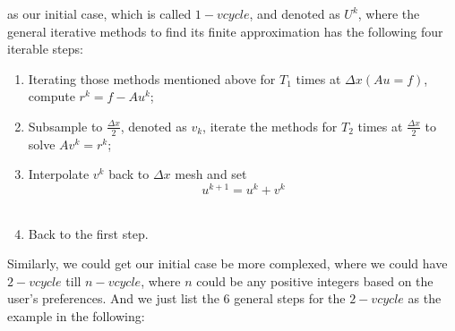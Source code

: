 \documentclass [a4paper, 12pt]{article}
\begin{document}
as our initial case, which is called $1-vcycle$, and denoted as $U^k$, where the general iterative methods to find its finite approximation has the following four iterable steps: 
\begin {enumerate}
\item Iterating those methods mentioned above for $T_1$ times at $\Delta x (Au=f)$, compute $r^k=f-Au^k$; \\
\item Subsample to $\frac {\Delta x}
                                                                   {2}$,
denoted as $v_k$, iterate the methods for $T_2$ times at $\frac {\Delta x}
                                                                                                              {2}$
to solve $Av^k=r^k$; \\
\item Interpolate $v^k$ back to $\Delta x$ mesh and set \\
\begin {equation}
     u^{k+1}=u^k+v^k
\end {equation} \\
\item Back to the first step. 
\end {enumerate}
Similarly, we could get our initial case be more complexed, where we could have $2-vcycle$ till $n-vcycle$, where $n$ could be any positive integers based on the user's preferences. And we just list the $6$ general steps for the $2-vcycle$ as the example in the following:
\end{document}
